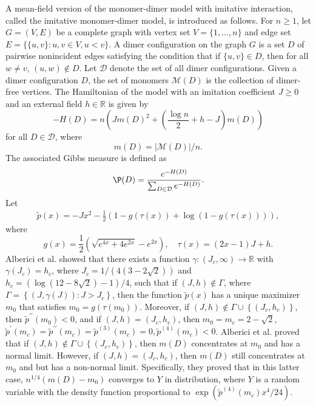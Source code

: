 	A mean-field version of the monomer-dimer model with imitative interaction, called the imitative monomer-dimer model, is introduced as follows. 
	For $n \ge 1$, let $G=(V, E)$ be a complete graph with vertex set $V=\{1, \ldots, n\}$ and edge set $E=\{\{u,v\}: u, v \in V, u<v\}$. 
	A dimer configuration on the graph $G$ is a set $D$ of pairwise nonincident 
	edges satisfying the condition that if $\{u,v\} \in D$, then for all $w \neq v$, $(u,w) \notin D$. 
	Let $\mathcal{D}$ denote the set of all dimer configurations. 
	Given a dimer configuration $D$, the set of monomers $\mathcal{M}(D)$ is the collection of dimer-free vertices. 
	The Hamiltonian of the model with an imitation coefficient $J \ge 0$ and an external field $h \in \mathbb{R}$ is given by
	\[-H(D)=n\left(Jm(D)^2+\left(\frac{\log n}{2}+h-J\right) m(D)\right)\]
	for all $D \in \mathcal{D}$, where 
	\[m(D)=|\mathcal{M}(D)|/n.\]
	The associated Gibbs measure is defined as
\[\P(D)=\frac{e^{-H(D)}}{\sum_{D \in \mathcal{D}} e^{-H(D)}}.\]
	Let
	\begin{align} \label{3.7}
		\tilde{p}(x)=-J x^2-\frac{1}{2}(1-g(\tau(x))+\log (1-g(\tau(x)))),
	\end{align}
	where
	\[g(x)=\frac{1}{2}\left(\sqrt{e^{4 x}+4 e^{2 x}}-e^{2 x}\right), \quad \tau(x)=(2 x-1) J+h.\]
	Alberici et al. \cite{alberici2014mean} showed that there exists a function 
	$\gamma:\left(J_c, \infty\right) \rightarrow \mathbb{R}$ with $\gamma\left(J_c\right)=h_c$,
	where $J_c=1/(4(3-2 \sqrt{2}))$ and $h_c=(\log(12-8\sqrt{2})-1)/4$, such that if $(J, h) \notin \Gamma$, where $\Gamma=\left\{(J, \gamma(J)): J>J_c\right\}$, then the function 
	$\tilde{p}(x)$ has a unique maximizer $m_0$ that satisfies $m_0=g\left(\tau\left(m_0\right)\right)$. Moreover, if $(J, h) \notin \Gamma \cup\left\{\left(J_c, h_c\right)\right\}$, then ${\tilde{p}}^{\prime \prime}\left(m_0\right)<0$, and if $(J, h)=\left(J_c, h_c\right)$, then $m_0=m_c=2-\sqrt{2}$, ${\tilde{p}}^{\prime}\left(m_c\right)={\tilde{p}}^{\prime \prime}\left(m_c\right)={\tilde{p}}^{(3)}\left(m_c\right)=0, {\tilde{p}}^{(4)}\left(m_c\right)<0$.
	Alberici et al. \cite{alberici2014mean} proved that if $(J, h) \notin \Gamma \cup\left\{\left(J_c, h_c\right)\right\}$,
	then $m(D)$ concentrates at $m_0$ and has a normal limit. 
	However, if $(J, h)=\left(J_c, h_c\right)$, then
	$m(D)$ still concentrates at $m_0$ and but has a non-normal limit. Specifically, they proved that in this latter case,
	$n^{1 / 4}\left(m(D)-m_0\right)$ converges to $Y$ in distribution, where $Y$ is a random variable with the density function proportional to
	$\exp({\tilde{p}}^{(4)}\left(m_c\right)x^4/24)$.
	
